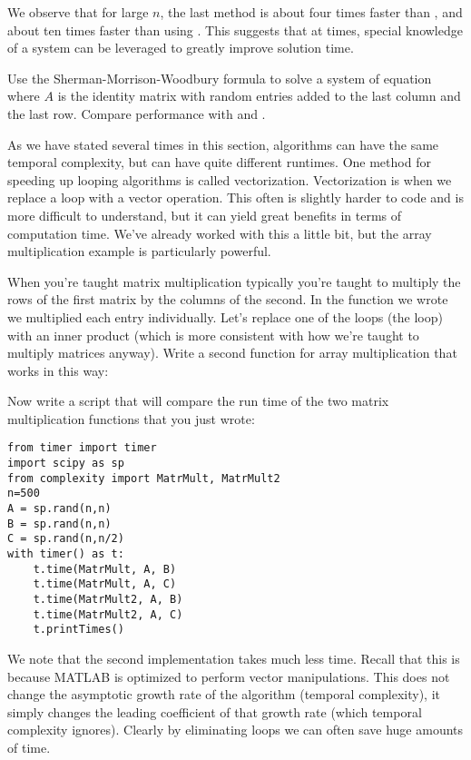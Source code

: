 We observe that for large $n$, the last method is about four times faster than , and about ten times faster than using . This suggests that at times, special knowledge of a system can be leveraged to greatly improve solution time.

\begin{problem}
Use the Sherman-Morrison-Woodbury formula to solve a system of equation where $A$ is the identity matrix with random entries added to the last column and the last row. Compare performance with  and .
\end{problem}

As we have stated several times in this section, algorithms can have the same temporal complexity, but can have quite different runtimes. One method for speeding up looping algorithms is called vectorization. Vectorization is when we replace a loop with a vector operation. This often is slightly harder to code and is more difficult to understand, but it can yield great benefits in terms of computation time. We've already worked with this a little bit, but the array multiplication example is particularly powerful.

When you're taught matrix multiplication typically you're taught to multiply the rows of the first matrix by the columns of the second. In the function we wrote we multiplied each entry individually. Let's replace one of the loops (the  loop) with an inner product (which is more consistent with how we're taught to multiply matrices anyway). Write a second function for array multiplication that works in this way:


Now write a script that will compare the run time of the two matrix multiplication functions that you just wrote:
\begin{lstlisting}
from timer import timer
import scipy as sp
from complexity import MatrMult, MatrMult2
n=500
A = sp.rand(n,n)
B = sp.rand(n,n)
C = sp.rand(n,n/2)
with timer() as t:
    t.time(MatrMult, A, B)
    t.time(MatrMult, A, C)
    t.time(MatrMult2, A, B)
    t.time(MatrMult2, A, C)
    t.printTimes()
\end{lstlisting}

We note that the second implementation takes much less time. Recall that this is because MATLAB is optimized to perform vector manipulations. This does not change the asymptotic growth rate of the algorithm (temporal complexity), it simply changes the leading coefficient of that growth rate (which temporal complexity ignores). Clearly by eliminating loops we can often save huge amounts of time.
